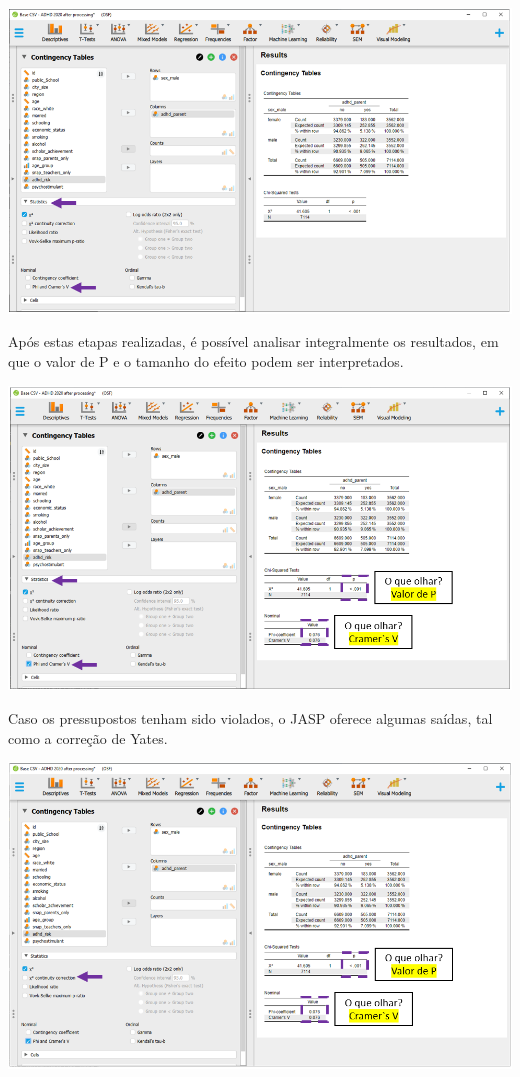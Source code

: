 \documentclass[
]{book}
\begin{document}
\includegraphics{./img/cap_x2_tamanho_do_efeito.png}

Após estas etapas realizadas, é possível analisar integralmente os resultados, em que o valor de P e o tamanho do efeito podem ser interpretados.

\includegraphics{./img/cap_x2_tabela.png}

Caso os pressupostos tenham sido violados, o JASP oferece algumas saídas, tal como a correção de Yates.

\includegraphics{./img/cap_x2_yates.png}
\end{document}
